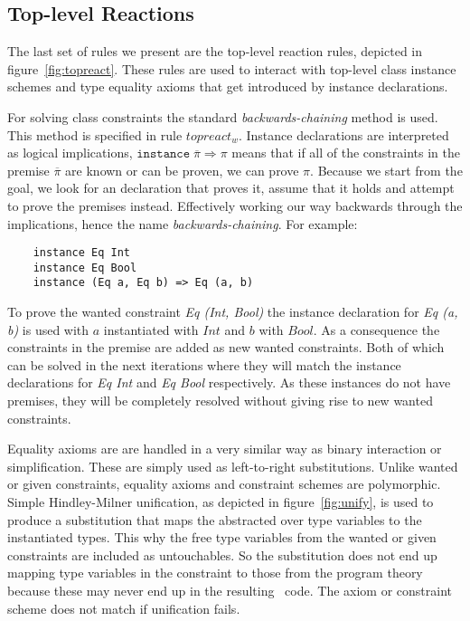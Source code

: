 \subsection{Top-level Reactions}
The last set of rules we present are the top-level reaction rules, depicted
in figure~\ref{fig:topreact}. These rules are used to interact with top-level
class instance schemes and type equality axioms that get introduced by instance
declarations.

For solving class constraints the standard \textit{backwards-chaining} method is
used. This method is specified in rule $topreact_w$. Instance declarations
are interpreted as logical implications, $\texttt{instance} \; \overline{\pi}
\Rightarrow \pi$ means that if all of the constraints in the premise
$\overline{\pi}$ are known or can be proven, we can prove $\pi$. Because we
start from the goal, we look for an declaration that proves it, assume that it
holds and attempt to prove the premises instead. Effectively working our way
backwards through the implications, hence the name \textit{backwards-chaining}.
For example:
\begin{verbatim}
    instance Eq Int
    instance Eq Bool
    instance (Eq a, Eq b) => Eq (a, b)
\end{verbatim}
To prove the wanted constraint \textit{Eq (Int, Bool)} the instance declaration
for \textit{Eq (a, b)} is used with $a$ instantiated with $Int$ and $b$ with
$Bool$. As a consequence the constraints in the premise are added as new wanted
constraints. Both of which can be solved in the next iterations where they will
match the instance declarations for \textit{Eq Int} and \textit{Eq Bool}
respectively. As these instances do not have premises, they will be completely
resolved without giving rise to new wanted constraints.

Equality axioms are are handled in a very similar way as binary interaction or
simplification. These are simply used as left-to-right substitutions. Unlike
wanted or given constraints, equality axioms and constraint schemes are
polymorphic. Simple Hindley-Milner\cite{hindley}\cite{damas-milner} unification,
as depicted in
figure~\ref{fig:unify}, is used to produce a substitution that maps the
abstracted over type variables to the instantiated types. This why the free type
variables from the wanted or given constraints are included as untouchables. So
the substitution does not end up mapping type variables in the constraint to
those from the program theory because these may never end up in the resulting
\systemfc ~code. The axiom or constraint scheme does not match if
unification fails.

